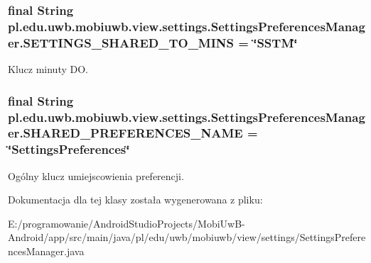 \subsubsection[{S\+E\+T\+T\+I\+N\+G\+S\+\_\+\+S\+H\+A\+R\+E\+D\+\_\+\+T\+O\+\_\+\+M\+I\+N\+S}]{\setlength{\rightskip}{0pt plus 5cm}final String pl.\+edu.\+uwb.\+mobiuwb.\+view.\+settings.\+Settings\+Preferences\+Manager.\+S\+E\+T\+T\+I\+N\+G\+S\+\_\+\+S\+H\+A\+R\+E\+D\+\_\+\+T\+O\+\_\+\+M\+I\+N\+S = \char`\"{}S\+S\+T\+M\char`\"{}\hspace{0.3cm}{\ttfamily [static]}}\label{classpl_1_1edu_1_1uwb_1_1mobiuwb_1_1view_1_1settings_1_1_settings_preferences_manager_aac08fe062bb7b7453b578cea7db516a4}
Klucz minuty D\+O. \hypertarget{classpl_1_1edu_1_1uwb_1_1mobiuwb_1_1view_1_1settings_1_1_settings_preferences_manager_af0cac7efad9591dab402f6a4f40baa18}{}
\subsubsection[{S\+H\+A\+R\+E\+D\+\_\+\+P\+R\+E\+F\+E\+R\+E\+N\+C\+E\+S\+\_\+\+N\+A\+M\+E}]{\setlength{\rightskip}{0pt plus 5cm}final String pl.\+edu.\+uwb.\+mobiuwb.\+view.\+settings.\+Settings\+Preferences\+Manager.\+S\+H\+A\+R\+E\+D\+\_\+\+P\+R\+E\+F\+E\+R\+E\+N\+C\+E\+S\+\_\+\+N\+A\+M\+E = \char`\"{}Settings\+Preferences\char`\"{}\hspace{0.3cm}{\ttfamily [static]}}\label{classpl_1_1edu_1_1uwb_1_1mobiuwb_1_1view_1_1settings_1_1_settings_preferences_manager_af0cac7efad9591dab402f6a4f40baa18}
Ogólny klucz umiejscowienia preferencji. 

Dokumentacja dla tej klasy została wygenerowana z pliku\+:\begin{DoxyCompactItemize}
\item 
E\+:/programowanie/\+Android\+Studio\+Projects/\+Mobi\+Uw\+B-\/\+Android/app/src/main/java/pl/edu/uwb/mobiuwb/view/settings/Settings\+Preferences\+Manager.\+java\end{DoxyCompactItemize}
